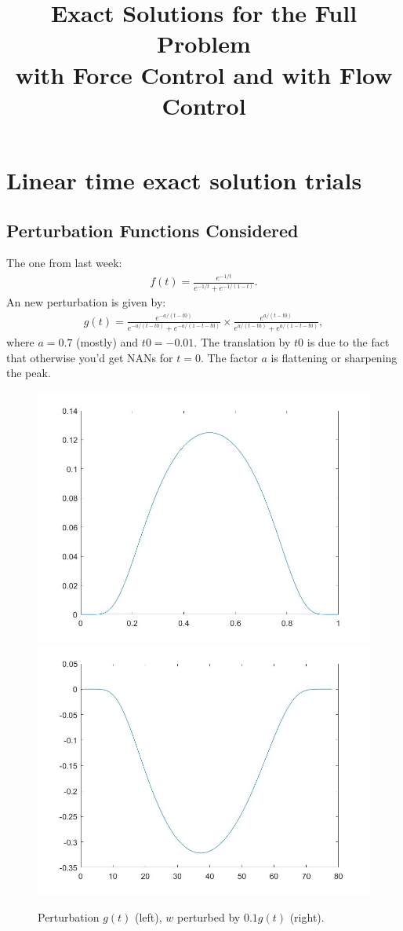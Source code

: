 \documentclass[11pt, a4paper]{article}
\title{Exact Solutions for the Full Problem \\with Force Control and with Flow Control}
\date{}
\theoremstyle{definition}
\begin{document}
\section*{Linear time exact solution trials}

\subsection*{Perturbation Functions Considered}
The one from last week:
\begin{align*}
f(t) = \frac{e^{-1/t}}{e^{-1/t} + e^{-1/(1-t)}}.
\end{align*}
An new perturbation is given by:
\begin{align*}
g(t) = \frac{e^{-a/(t-t0)}}{e^{-a/(t-t0)}+ e^{-a/(1-t-t0)}} \times \frac{e^{a/(t-t0)}}{e^{a/(t-t0)}+ e^{a/(1-t-t0)}},
\end{align*}
where $a=0.7$ (mostly) and $t0 = -0.01$. The translation by $t0$ is due to the fact that otherwise you'd get NANs for $t=0$. The factor $a$ is flattening or sharpening the peak.\\
\begin{figure}[h]
	\includegraphics[scale=0.3]{Pertfun2.jpg}
	\includegraphics[scale=0.3]{wPert3.jpg}
	\caption{Perturbation $g(t)$ (left), $w$ perturbed by $0.1g(t)$ (right).}
\end{figure}
\end{document}
